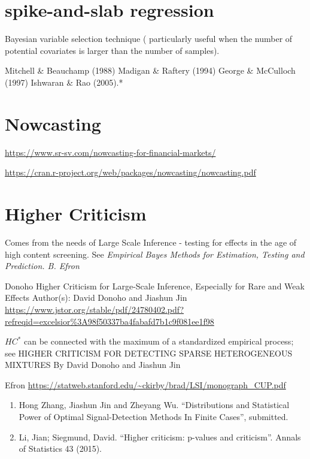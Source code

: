 \documentclass[
  11pt,
]{book}
\begin{document}
\hypertarget{spike-and-slab-regression}{%
\section{spike-and-slab regression}\label{spike-and-slab-regression}}

Bayesian variable selection technique ( particularly useful when the number of potential covariates is larger than the number of samples).

Mitchell \& Beauchamp (1988)
Madigan \& Raftery (1994)
George \& McCulloch (1997)
Ishwaran \& Rao (2005).*

\hypertarget{nowcasting}{%
\section{Nowcasting}\label{nowcasting}}

\url{https://www.sr-sv.com/nowcasting-for-financial-markets/}

\url{https://cran.r-project.org/web/packages/nowcasting/nowcasting.pdf}

\hypertarget{higher-criticism}{%
\section{Higher Criticism}\label{higher-criticism}}

Comes from the needs of Large Scale Inference - testing for effects in the age of high content screening. See
\emph{Empirical Bayes Methods for Estimation, Testing and Prediction. B. Efron}

Donoho
Higher Criticism for Large-Scale Inference, Especially for Rare and Weak Effects
Author(s): David Donoho and Jiashun Jin
\url{https://www.jstor.org/stable/pdf/24780402.pdf?refreqid=excelsior\%3A98f50337ba4fabafd7b1c9f081ee1f98}

\(HC^{*}\) can be connected with the maximum of a standardized empirical process; see
HIGHER CRITICISM FOR DETECTING SPARSE HETEROGENEOUS MIXTURES By David Donoho and Jiashun Jin

Efron
\url{https://statweb.stanford.edu/~ckirby/brad/LSI/monograph_CUP.pdf}

\begin{enumerate}
\def\labelenumi{\arabic{enumi}.}
\item
  Hong Zhang, Jiashun Jin and Zheyang Wu. ``Distributions and Statistical Power of Optimal Signal-Detection Methods In Finite Cases'', submitted.
\item
  Li, Jian; Siegmund, David. ``Higher criticism: p-values and criticism''. Annals of Statistics 43 (2015).
\end{enumerate}
\end{document}
